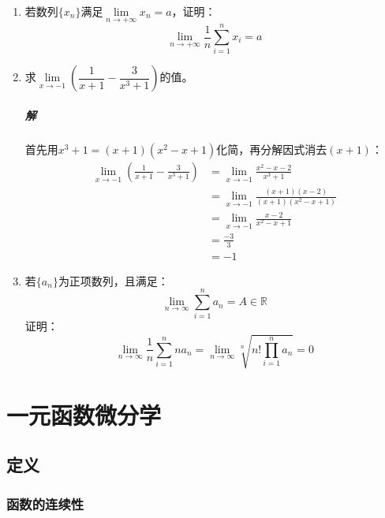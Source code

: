 \documentclass[fontset=none,openany,a4paper]{ctexbook}
\begin{document}
\begin{enumerate}
    不能丢掉，因为如果没有这个条件，只能导出$\lim\limits_{x\to a}g(f(x))=g(A)$，而不能导出$\lim\limits_{x\to a}g(f(x))=B$，例如构造一个函数$g(x)$，使得$x\neq A$时$g(x)\equiv B$且$g(A)\neq B$，则这样的函数满足定理的其余所有条件但无法推出结论。

    \item 若数列$\{x_n\}$满足$\lim\limits_{n\to+\infty}x_n=a$，证明：
    \[
    \lim_{n\to+\infty}\frac{1}{n}\sum_{i=1}^n x_i=a
    \]

    \item 求$\lim\limits_{x\to-1}\left(\dfrac{1}{x+1}-\dfrac{3}{x^3+1}\right)$的值。

    \paragraph{解}

    首先用$x^3+1=(x+1)(x^2-x+1)$化简，再分解因式消去$(x+1)$：
    \begin{align*}
        \lim_{x\to-1}\left(\frac{1}{x+1}-\frac{3}{x^3+1}\right)
        &= \lim_{x\to-1}\frac{x^2-x-2}{x^3+1} \\
        &= \lim_{x\to-1}\frac{(x+1)(x-2)}{(x+1)(x^2-x+1)} \\
        &= \lim_{x\to-1}\frac{x-2}{x^2-x+1} \\
        &= \frac{-3}{3} \\
        &= -1
    \end{align*}

    \item 若$\{a_n\}$为正项数列，且满足：
    \[
    \lim_{n\to\infty}\sum_{i=1}^n a_n = A \in \mathbb{R}
    \]
    证明：
    \[
    \lim_{n\to\infty}\frac{1}{n}\sum_{i=1}^n na_n = \lim_{n\to\infty}\sqrt[n]{n!\prod_{i=1}^n a_n} = 0
    \]

\end{enumerate}

\chapter{一元函数微分学}

\section{定义}

\subsection{函数的连续性}
\end{document}
